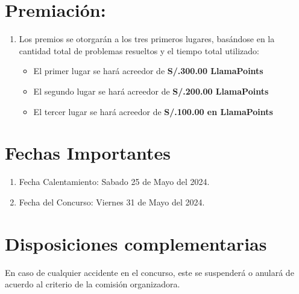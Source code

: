 \documentclass{article}
\begin{document}
\begin{itemize}
          \section{Premiación:}
          \begin{enumerate}
              \item Los premios se otorgarán a los tres primeros lugares, basándose en la cantidad total de
                    problemas resueltos y el tiempo total utilizado:
                    \begin{itemize}
                        \item El primer lugar se hará acreedor de \textbf{S/.300.00 LlamaPoints}
                        \item El segundo lugar se hará acreedor de \textbf{S/.200.00 LlamaPoints}
                        \item El tercer lugar se hará acreedor de \textbf{S/.100.00 en LlamaPoints}
                    \end{itemize}
          \end{enumerate}
          \section{Fechas Importantes}
          \begin{enumerate}
              \item Fecha Calentamiento: Sabado 25 de Mayo del 2024.
              \item Fecha del Concurso: Viernes 31 de Mayo del 2024.
          \end{enumerate}
          \section{Disposiciones complementarias}
          En caso de cualquier accidente en el concurso, este se suspenderá o anulará de
          acuerdo al criterio de la comisión organizadora.



\end{itemize}
\end{document}
